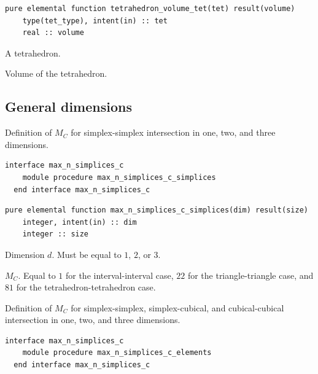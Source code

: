 \documentclass{article}
\begin{document}
\begin{lstlisting}[language=FORTRAN]
  pure elemental function tetrahedron_volume_tet(tet) result(volume)
    type(tet_type), intent(in) :: tet
    real :: volume
\end{lstlisting}

\begin{description}[font=\ttfamily\bfseries,leftmargin=2.2\parindent,labelindent=1.7\parindent,noitemsep]
  \item[tet] A tetrahedron.
  \item[volume] Volume of the tetrahedron.
\end{description}

\subsection{General dimensions}\label{sect:nD_intersection}

Definition of $M_C$ for simplex-simplex intersection in one, two, and three
dimensions.

\begin{lstlisting}[language=FORTRAN]
  interface max_n_simplices_c
    module procedure max_n_simplices_c_simplices
  end interface max_n_simplices_c
\end{lstlisting}

\begin{lstlisting}[language=FORTRAN]
  pure elemental function max_n_simplices_c_simplices(dim) result(size)
    integer, intent(in) :: dim
    integer :: size
\end{lstlisting}

\begin{description}[font=\ttfamily\bfseries,leftmargin=2.2\parindent,labelindent=1.7\parindent,noitemsep]
  \item[dim] Dimension $d$. Must be equal to $1$, $2$, or $3$.
  \item[size] $M_C$. Equal to $1$ for the interval-interval case, $22$ for the
    triangle-triangle case, and $81$ for the tetrahedron-tetrahedron case.
\end{description}

\noindent Definition of $M_C$ for simplex-simplex, simplex-cubical, and
cubical-cubical intersection in one, two, and three dimensions.
  
\begin{lstlisting}[language=FORTRAN]
  interface max_n_simplices_c
    module procedure max_n_simplices_c_elements
  end interface max_n_simplices_c
\end{lstlisting}
\end{document}
